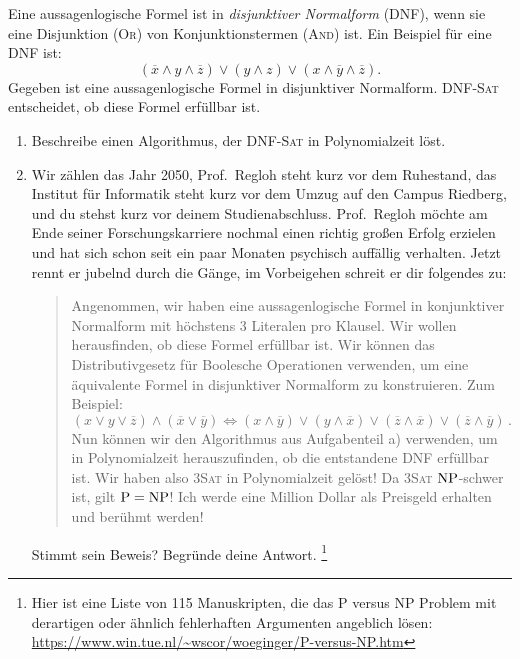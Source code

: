 \documentclass{uebung_cs}
\begin{document}
\begin{exercise}[DNF Erfüllbarkeit][\athome]
	Eine aussagenlogische Formel ist in \textit{disjunktiver Normalform} (DNF), wenn sie eine Disjunktion (\textsc{Or}) von Konjunktionstermen (\textsc{And}) ist. Ein Beispiel für eine DNF ist:
	$$(\overline{x} \wedge y \wedge \overline{z}) \vee (y \wedge z) \vee (x \wedge \overline{y} \wedge \overline{z}).$$
	Gegeben ist eine aussagenlogische Formel in disjunktiver Normalform. DNF-\textsc{Sat} entscheidet, ob diese Formel erfüllbar ist.
	\begin{enumerate}
		\item\easy Beschreibe einen Algorithmus, der DNF-\textsc{Sat} in Polynomialzeit  löst.
		\item\medium Wir zählen das Jahr 2050, Prof.\ Regloh steht kurz vor dem Ruhestand, das Institut für Informatik steht kurz vor dem Umzug auf den Campus Riedberg, und du stehst kurz vor deinem Studienabschluss. Prof.\ Regloh möchte am Ende seiner Forschungskarriere nochmal einen richtig großen Erfolg erzielen und hat sich schon seit ein paar Monaten psychisch auffällig verhalten. Jetzt rennt er jubelnd durch die Gänge, im Vorbeigehen schreit er dir folgendes zu:
		      \begin{quote}
			      Angenommen, wir haben eine aussagenlogische Formel in konjunktiver Normalform mit höchstens 3 Literalen pro Klausel. Wir wollen herausfinden, ob diese Formel erfüllbar ist. Wir können das Distributivgesetz für Boolesche Operationen verwenden, um eine äquivalente Formel in disjunktiver Normalform zu konstruieren. Zum Beispiel:
			      \[(x \vee y \vee \overline{z}) \wedge (\overline{x} \vee \overline{y}) \Leftrightarrow (x \wedge \overline{y}) \vee (y \wedge \overline{x}) \vee (\overline{z} \wedge \overline{x}) \vee (\overline{z} \wedge \overline{y})\,.\]
			      Nun können wir den Algorithmus aus Aufgabenteil a) verwenden, um in Polynomialzeit herauszufinden, ob die entstandene DNF erfüllbar ist. Wir haben also \textsc{3Sat} in Polynomialzeit gelöst! Da \textsc{3Sat} $\mathrm{NP}$-schwer ist, gilt $\mathrm{P} = \mathrm{NP}$! Ich werde eine Million Dollar als Preisgeld erhalten und berühmt werden!
		      \end{quote}
			  Stimmt sein Beweis? Begründe deine Antwort.%
			  \footnote{Hier ist eine Liste von 115 Manuskripten, die das P versus NP Problem mit derartigen oder ähnlich fehlerhaften Argumenten angeblich lösen: \url{https://www.win.tue.nl/~wscor/woeginger/P-versus-NP.htm}}
	\end{enumerate}
\end{exercise}
\newpage
\end{document}

